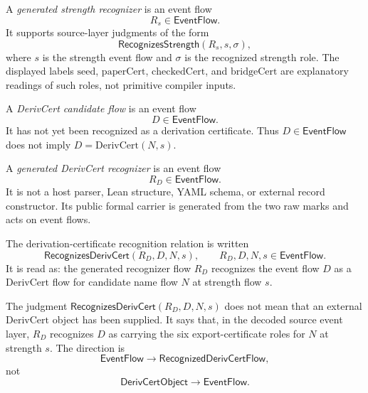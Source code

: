 \begin{definition}
\label{def:derivcert-generated-strength-recognizer}
A \emph{generated strength recognizer} is an event flow
$$
  R_s \in \mathsf{EventFlow}.
$$
It supports source-layer judgments of the form
$$
  \mathsf{RecognizesStrength}(R_s,s,\sigma),
$$
where $s$ is the strength event flow and $\sigma$ is the recognized strength role. The displayed labels $\mathrm{seed}$, $\mathrm{paperCert}$, $\mathrm{checkedCert}$, and $\mathrm{bridgeCert}$ are explanatory readings of such roles, not primitive compiler inputs.
\end{definition}

\begin{definition}
\label{def:derivcert-generated-candidate-flow}
A \emph{DerivCert candidate flow} is an event flow
$$
  D \in \mathsf{EventFlow}.
$$
It has not yet been recognized as a derivation certificate. Thus $D \in \mathsf{EventFlow}$ does not imply $D=\mathrm{DerivCert}(N,s)$.
\end{definition}

\begin{definition}
\label{def:derivcert-generated-recognizer}
A \emph{generated DerivCert recognizer} is an event flow
$$
  R_D \in \mathsf{EventFlow}.
$$
It is not a host parser, Lean structure, YAML schema, or external record constructor. Its public formal carrier is generated from the two raw marks and acts on event flows.
\end{definition}

\begin{definition}
\label{def:derivcert-generated-recognition-relation}
The derivation-certificate recognition relation is written
$$
  \mathsf{RecognizesDerivCert}(R_D,D,N,s),
  \qquad
  R_D,D,N,s \in \mathsf{EventFlow}.
$$
It is read as: the generated recognizer flow $R_D$ recognizes the event flow $D$ as a $\mathrm{DerivCert}$ flow for candidate name flow $N$ at strength flow $s$.
\end{definition}

\begin{remark}
\label{rem:derivcert-generated-recognition-not-input}
The judgment $\mathsf{RecognizesDerivCert}(R_D,D,N,s)$ does not mean that an external $\mathrm{DerivCert}$ object has been supplied. It says that, in the decoded source event layer, $R_D$ recognizes $D$ as carrying the six export-certificate roles for $N$ at strength $s$. The direction is
$$
  \mathsf{EventFlow}
  \longrightarrow
  \mathsf{RecognizedDerivCertFlow},
$$
not
$$
  \mathsf{DerivCertObject}
  \longrightarrow
  \mathsf{EventFlow}.
$$
\end{remark}

